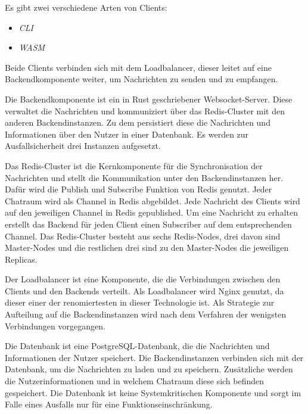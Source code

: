 \begin{description}[style=nextline]
    \item [Client] Es gibt zwei verschiedene Arten von Clients: 
        \begin{itemize} 
            \item \textit{\ac{CLI}} 
            \item \textit{\ac{WASM}}
        \end{itemize}
        Beide Clients verbinden sich mit dem Loadbalancer, dieser leitet auf eine Backendkomponente weiter, um Nachrichten zu senden und zu empfangen.

    \item [Backend] Die Backendkomponente ist ein in Rust geschriebener Websocket-Server.
        Diese verwaltet die Nachrichten und kommuniziert über das Redis-Cluster mit den anderen Backendinstanzen.
        Zu dem persistiert diese die Nachrichten und Informationen über den Nutzer in einer Datenbank.
        Es werden zur Ausfallsicherheit drei Instanzen aufgesetzt.

    \item [Redis-Cluster] Das Redis-Cluster ist die Kernkomponente für die Synchronisation der Nachrichten und stellt die Kommunikation unter den Backendinstanzen her.
        Dafür wird die Publish und Subscribe Funktion von Redis genutzt.
        Jeder Chatraum wird als Channel in Redis abgebildet.
        Jede Nachricht des Clients wird auf den jeweiligen Channel in Redis gepublished.
        Um eine Nachricht zu erhalten erstellt das Backend für jeden Client einen Subscriber auf dem entsprechenden Channel.
        Das Redis-Cluster besteht aus sechs Redis-Nodes, drei davon sind Master-Nodes und die restlichen drei sind zu den Master-Nodes die jeweiligen Replicas.

    \item [Loadbalancer] Der Loadbalancer ist eine Komponente, die die Verbindungen zwischen den Clients und den Backends verteilt.
        Als Loadbalancer wird Nginx genutzt, da dieser einer der renomiertesten in dieser Technologie ist.
        Als Strategie zur Aufteilung auf die Backendinstanzen wird nach dem Verfahren der wenigsten Verbindungen vorgegangen.

    \item [Datenbank] Die Datenbank ist eine PostgreSQL-Datenbank, die die Nachrichten und Informationen der Nutzer speichert.
        Die Backendinstanzen verbinden sich mit der Datenbank, um die Nachrichten zu laden und zu speichern.
        Zusätzliche werden die Nutzerinformationen und in welchem Chatraum diese sich befinden gespeichert.
        Die Datenbank ist keine Systemkritischen Komponente und sorgt im Falle eines Ausfalls nur für eine Funktionseinschränkung.
\end{description}


